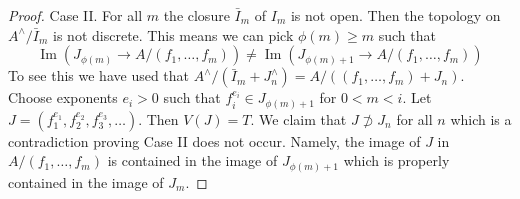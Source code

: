 \documentclass{amsart}
\theoremstyle{plain}
\theoremstyle{definition}
\theoremstyle{remark}
\numberwithin{equation}{subsection}
\def\Im{\mathop{\mathrm{Im}}}
\begin{document}
\begin{proof}
\medskip\noindent
Case II. For all $m$ the closure $\bar I_m$ of $I_m$ is not open.
Then the topology on $A^\wedge/\bar I_m$ is not discrete. This means
we can pick $\phi(m) \geq m$ such that
$$
\Im(J_{\phi(m)} \to A/(f_1, \ldots, f_m)) \not =
\Im(J_{\phi(m) + 1} \to A/(f_1, \ldots, f_m))
$$
To see this we have used that
$A^\wedge/(\bar I_m + J_n^\wedge) = A/((f_1, \ldots, f_m) + J_n)$.
Choose exponents $e_i > 0$ such that $f_i^{e_i} \in J_{\phi(m) + 1}$
for $0 < m < i$. Let $J = (f_1^{e_1}, f_2^{e_2}, f_3^{e_3}, \ldots)$.
Then $V(J) = T$. We claim that $J \not \supset J_n$ for all $n$
which is a contradiction proving Case II does not occur.
Namely, the image of $J$ in $A/(f_1, \ldots, f_m)$ is contained
in the image of $J_{\phi(m) + 1}$ which is properly contained in the
image of $J_m$.
\end{proof}
\end{document}
